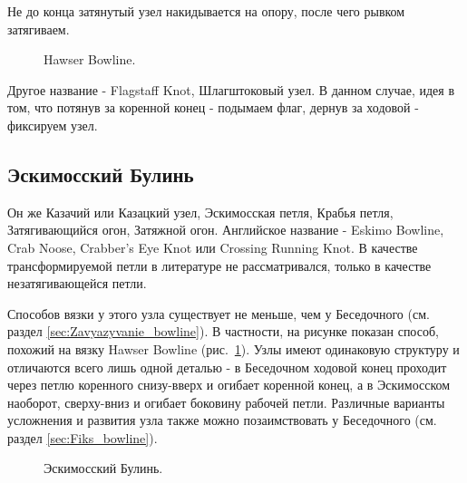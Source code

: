 Не до конца затянутый узел накидывается на опору, после чего рывком затягиваем.

\begin{figure}[H]\centering
	\subfloat[Результат]{\label{ris:Hawser_Bowline_3}
	\tcbox[enhanced jigsaw,colframe=black,opacityframe=0.5,opacityback=0.5]
		{\centering
			}
		}
	\caption{Hawser Bowline.}\label{ris:Hawser_Bowline}
\end{figure}

Другое название - Flagstaff Knot, Шлагштоковый узел. В данном случае, идея в том, что потянув за коренной конец - подымаем флаг, дернув за ходовой - фиксируем узел.

\subsection{Эскимосский Булинь}

Он же Казачий или Казацкий узел, Эскимосская петля, Крабья петля, Затягивающийся огон, Затяжной огон. Английское название - Eskimo Bowline, Crab Noose, Crabber’s Eye Knot или Crossing Running Knot. В качестве трансформируемой петли в литературе не рассматривался, только в качестве незатягивающейся петли.

\begin{figure}[H]\centering
	\subfloat[Завязывание]{\label{ris:Kazak_1}
	\tcbox[enhanced jigsaw,colframe=black,opacityframe=0.5,opacityback=0.5]
		{\centering
			}
		}
\hfil
	\subfloat[Результат]{\label{ris:Kazak_2}
	\tcbox[enhanced jigsaw,colframe=black,opacityframe=0.5,opacityback=0.5]
		{\centering
			}
		}
\end{figure}

Способов вязки у этого узла существует не меньше, чем у Беседочного (см. раздел \ref{sec:Zavyazyvanie_bowline}). В частности, на рисунке показан способ, похожий на вязку Hawser Bowline (рис.~\ref{ris:Hawser_Bowline}). Узлы имеют одинаковую структуру и отличаются всего лишь одной деталью - в Беседочном ходовой конец проходит через петлю коренного снизу-вверх и огибает коренной конец, а в Эскимосском наоборот, сверху-вниз и огибает боковину рабочей петли. Различные варианты усложнения и развития узла также можно позаимствовать у Беседочного (см. раздел \ref{sec:Fiks_bowline}).

\begin{figure}[H]\centering
	\caption{Эскимосский Булинь.}\label{ris:Kazak}
\end{figure}

